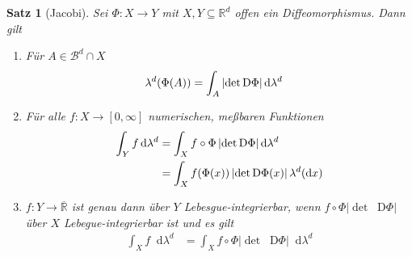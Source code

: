 \documentclass[11pt, twoside, a4paper]{article}
\theoremstyle{plain}
\newtheorem{satz}[blockelement]{Satz}
\numberwithin{equation}{subsection}
\newcommand{\of}[1]{\mathopen{}\mathclose{}\bgroup\left(#1\aftergroup\egroup\right)}
\newcommand{\abs}[1]{\left\lvert#1\right\rvert}
\newcommand{\interv}[1]{\left[#1\right]}
\newcommand{\dif}{\mathop{}\!\mathrm{d}}
\newcommand{\Dif}{\mathop{}\!\mathrm{D}}
\newcommand{\R}{\mathbb{R}}
\newcommand{\mB}{\mathcal{B}}
\begin{document}
    \begin{satz}[Jacobi] %
        Sei $\Phi: X \to Y$ mit $X, Y\subseteq\R^d$ offen ein Diffeomorphismus. Dann gilt
        \begin{enumerate}[label=(\roman*)]
            \item
            Für $A\in\mB^d \cap X$
            \begin{align*}
                \lambda^d\of{\Phi\of{A}} &= \int_{A}^{} \abs{\det \Dif\Phi} \dif\lambda^d
            \end{align*}
            \item Für alle $f: X \to \interv{0, \infty}$ numerischen, meßbaren Funktionen
            \begin{align*}
                \int_{Y}^{} f \dif \lambda^d &= \int_{X}^{} f\circ \Phi \abs{\det \Dif\Phi} \dif \lambda^d\\
                &= \int_{X}^{} f\of{\Phi\of{x}}\abs{\det \Dif\Phi\of{x}} \lambda^d\of{\dif x}
            \end{align*}
            \item $f: Y \to\overline{\R}$ ist genau dann über $Y$ Lebesgue-integrierbar, wenn $f\circ \Phi \abs{\det \Dif\Phi}$ über $X$ Lebegue-integrierbar ist und es gilt
            \begin{align*}
                \int_{X}^{} f \dif\lambda^d &= \int_{X}^{} f\circ\Phi\abs{\det\Dif\Phi} \dif \lambda^d
            \end{align*}
        \end{enumerate}


\end{satz}
\end{document}
